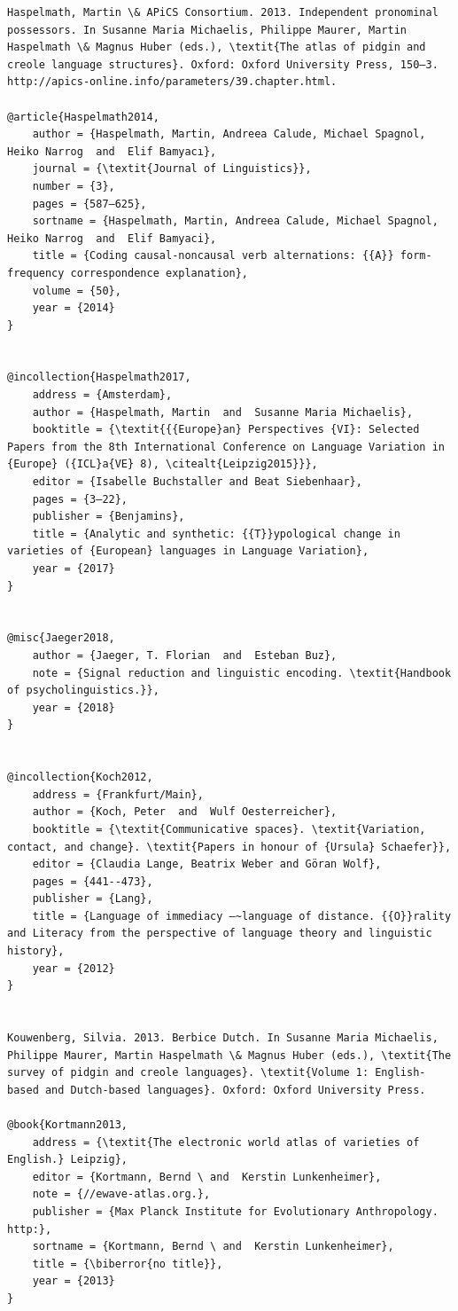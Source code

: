 \documentclass[output=paper]{langsci/langscibook}
\begin{document}
\begin{verbatim}
Haspelmath, Martin \& APiCS Consortium. 2013. Independent pronominal possessors. In Susanne Maria Michaelis, Philippe Maurer, Martin Haspelmath \& Magnus Huber (eds.), \textit{The atlas of pidgin and creole language structures}. Oxford: Oxford University Press, 150–3. http://apics-online.info/parameters/39.chapter.html.

@article{Haspelmath2014,
	author = {Haspelmath, Martin, Andreea Calude, Michael Spagnol, Heiko Narrog  and  Elif Bamyacı},
	journal = {\textit{Journal of Linguistics}},
	number = {3},
	pages = {587–625},
	sortname = {Haspelmath, Martin, Andreea Calude, Michael Spagnol, Heiko Narrog  and  Elif Bamyaci},
	title = {Coding causal-noncausal verb alternations: {{A}} form-frequency correspondence explanation},
	volume = {50},
	year = {2014}
}


@incollection{Haspelmath2017,
	address = {Amsterdam},
	author = {Haspelmath, Martin  and  Susanne Maria Michaelis},
	booktitle = {\textit{{{Europe}an} Perspectives {VI}: Selected Papers from the 8th International Conference on Language Variation in {Europe} ({ICL}a{VE} 8), \citealt{Leipzig2015}}},
	editor = {Isabelle Buchstaller and Beat Siebenhaar},
	pages = {3–22},
	publisher = {Benjamins},
	title = {Analytic and synthetic: {{T}}ypological change in varieties of {European} languages in Language Variation},
	year = {2017}
}


@misc{Jaeger2018,
	author = {Jaeger, T. Florian  and  Esteban Buz},
	note = {Signal reduction and linguistic encoding. \textit{Handbook of psycholinguistics.}},
	year = {2018}
}


@incollection{Koch2012,
	address = {Frankfurt/Main},
	author = {Koch, Peter  and  Wulf Oesterreicher},
	booktitle = {\textit{Communicative spaces}. \textit{Variation, contact, and change}. \textit{Papers in honour of {Ursula} Schaefer}},
	editor = {Claudia Lange, Beatrix Weber and Göran Wolf},
	pages = {441--473},
	publisher = {Lang},
	title = {Language of immediacy –~language of distance. {{O}}rality and Literacy from the perspective of language theory and linguistic history},
	year = {2012}
}


Kouwenberg, Silvia. 2013. Berbice Dutch. In Susanne Maria Michaelis, Philippe Maurer, Martin Haspelmath \& Magnus Huber (eds.), \textit{The survey of pidgin and creole languages}. \textit{Volume 1: English-based and Dutch-based languages}. Oxford: Oxford University Press.

@book{Kortmann2013,
	address = {\textit{The electronic world atlas of varieties of English.} Leipzig},
	editor = {Kortmann, Bernd \ and  Kerstin Lunkenheimer},
	note = {//ewave-atlas.org.},
	publisher = {Max Planck Institute for Evolutionary Anthropology. http:},
	sortname = {Kortmann, Bernd \ and  Kerstin Lunkenheimer},
	title = {\biberror{no title}},
	year = {2013}
}



\end{verbatim}
\end{document}
